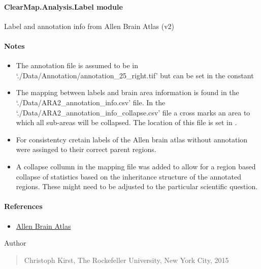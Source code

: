 \documentclass[letterpaper,10pt,english]{sphinxmanual}
\begin{document}
\paragraph{ClearMap.Analysis.Label module}
\label{api/ClearMap.Analysis:module-ClearMap.Analysis.Label}\label{api/ClearMap.Analysis:clearmap-analysis-label-module}
Label and annotation info from Allen Brain Atlas (v2)
\paragraph{Notes}
\begin{itemize}
\item {} 
The annotation file is assumed to be in `./Data/Annotation/annotation\_25\_right.tif'
but can be set in the constant {\hyperref[api/ClearMap.Analysis:ClearMap.Analysis.Label.DefaultLabeledImageFile]{\emph{}}}

\item {} 
The mapping between labels and brain area information is found in the
`./Data/ARA2\_annotation\_info.csv' file.
In the `./Data/ARA2\_annotation\_info\_collapse.csv' file a cross marks an area
to which all sub-areas will be collapsed.
The location of this file is set in {\hyperref[api/ClearMap.Analysis:ClearMap.Analysis.Label.DefaultAnnotationFile]{\emph{}}}.

\item {} 
For consistentcy cretain labels of the Allen brain atlas without
annotation were assinged to their correct parent regions.

\item {} 
A collapse collumn in the mapping file was added to allow for a region
based collapse of statistics based on the inheritance structure of the
annotated regions. These might need to be adjusted to the particular
scientific question.

\end{itemize}
\paragraph{References}
\begin{itemize}
\item {} 
\href{http://mouse.brain-map.org/static/atlas}{Allen Brain Atlas}

\end{itemize}

Author
\begin{quote}

Christoph Kirst, The Rockefeller University, New York City, 2015
\end{quote}
\end{document}
